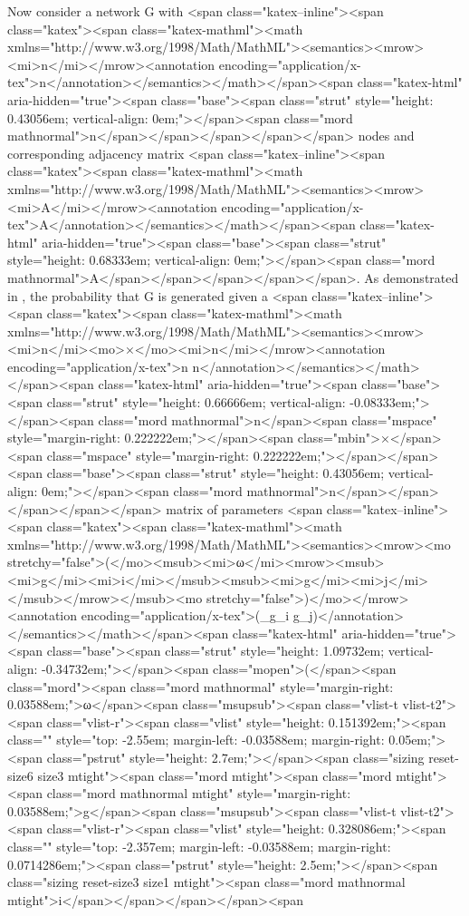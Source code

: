 Now consider a network G with <span class="katex--inline"><span class="katex"><span class="katex-mathml"><math xmlns="http://www.w3.org/1998/Math/MathML"><semantics><mrow><mi>n</mi></mrow><annotation encoding="application/x-tex">n</annotation></semantics></math></span><span class="katex-html" aria-hidden="true"><span class="base"><span class="strut" style="height: 0.43056em; vertical-align: 0em;"></span><span class="mord mathnormal">n</span></span></span></span></span> nodes and corresponding adjacency matrix <span class="katex--inline"><span class="katex"><span class="katex-mathml"><math xmlns="http://www.w3.org/1998/Math/MathML"><semantics><mrow><mi>A</mi></mrow><annotation encoding="application/x-tex">A</annotation></semantics></math></span><span class="katex-html" aria-hidden="true"><span class="base"><span class="strut" style="height: 0.68333em; vertical-align: 0em;"></span><span class="mord mathnormal">A</span></span></span></span></span>. As demonstrated in \cite{karrer_newman_2011}, the probability that G is generated given a <span class="katex--inline"><span class="katex"><span class="katex-mathml"><math xmlns="http://www.w3.org/1998/Math/MathML"><semantics><mrow><mi>n</mi><mo>×</mo><mi>n</mi></mrow><annotation encoding="application/x-tex">n \times n</annotation></semantics></math></span><span class="katex-html" aria-hidden="true"><span class="base"><span class="strut" style="height: 0.66666em; vertical-align: -0.08333em;"></span><span class="mord mathnormal">n</span><span class="mspace" style="margin-right: 0.222222em;"></span><span class="mbin">×</span><span class="mspace" style="margin-right: 0.222222em;"></span></span><span class="base"><span class="strut" style="height: 0.43056em; vertical-align: 0em;"></span><span class="mord mathnormal">n</span></span></span></span></span> matrix of parameters <span class="katex--inline"><span class="katex"><span class="katex-mathml"><math xmlns="http://www.w3.org/1998/Math/MathML"><semantics><mrow><mo stretchy="false">(</mo><msub><mi>ω</mi><mrow><msub><mi>g</mi><mi>i</mi></msub><msub><mi>g</mi><mi>j</mi></msub></mrow></msub><mo stretchy="false">)</mo></mrow><annotation encoding="application/x-tex">(\omega_{g_i g_j})</annotation></semantics></math></span><span class="katex-html" aria-hidden="true"><span class="base"><span class="strut" style="height: 1.09732em; vertical-align: -0.34732em;"></span><span class="mopen">(</span><span class="mord"><span class="mord mathnormal" style="margin-right: 0.03588em;">ω</span><span class="msupsub"><span class="vlist-t vlist-t2"><span class="vlist-r"><span class="vlist" style="height: 0.151392em;"><span class="" style="top: -2.55em; margin-left: -0.03588em; margin-right: 0.05em;"><span class="pstrut" style="height: 2.7em;"></span><span class="sizing reset-size6 size3 mtight"><span class="mord mtight"><span class="mord mtight"><span class="mord mathnormal mtight" style="margin-right: 0.03588em;">g</span><span class="msupsub"><span class="vlist-t vlist-t2"><span class="vlist-r"><span class="vlist" style="height: 0.328086em;"><span class="" style="top: -2.357em; margin-left: -0.03588em; margin-right: 0.0714286em;"><span class="pstrut" style="height: 2.5em;"></span><span class="sizing reset-size3 size1 mtight"><span class="mord mathnormal mtight">i</span></span></span></span><span 